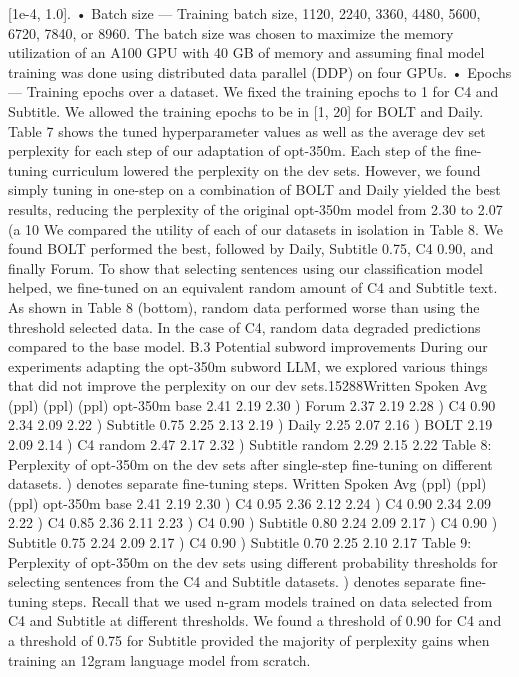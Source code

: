 [1e-4, 1.0].
• Batch size — Training batch size, 1120, 2240,
3360, 4480, 5600, 6720, 7840, or 8960. The batch
size was chosen to maximize the memory utilization of an A100 GPU with 40 GB of memory and
assuming final model training was done using
distributed data parallel (DDP) on four GPUs.
• Epochs — Training epochs over a dataset. We
fixed the training epochs to 1 for C4 and Subtitle.
We allowed the training epochs to be in [1, 20]
for BOLT and Daily.
Table 7 shows the tuned hyperparameter values
as well as the average dev set perplexity for each
step of our adaptation of opt-350m. Each step of
the fine-tuning curriculum lowered the perplexity
on the dev sets. However, we found simply tuning
in one-step on a combination of BOLT and Daily
yielded the best results, reducing the perplexity of
the original opt-350m model from 2.30 to 2.07 (a
10%
We compared the utility of each of our datasets
in isolation in Table 8. We found BOLT performed
the best, followed by Daily, Subtitle 0.75, C4 0.90,
and finally Forum. To show that selecting sentences using our classification model helped, we
fine-tuned on an equivalent random amount of C4
and Subtitle text. As shown in Table 8 (bottom),
random data performed worse than using the threshold selected data. In the case of C4, random data
degraded predictions compared to the base model.
B.3 Potential subword improvements
During our experiments adapting the opt-350m subword LLM, we explored various things that did not
improve the perplexity on our dev sets.15288Written Spoken Avg
(ppl) (ppl) (ppl)
opt-350m base 2.41 2.19 2.30
) Forum 2.37 2.19 2.28
) C4 0.90 2.34 2.09 2.22
) Subtitle 0.75 2.25 2.13 2.19
) Daily 2.25 2.07 2.16
) BOLT 2.19 2.09 2.14
) C4 random 2.47 2.17 2.32
) Subtitle random 2.29 2.15 2.22
Table 8: Perplexity of opt-350m on the dev sets after
single-step fine-tuning on different datasets. ) denotes
separate fine-tuning steps.
Written Spoken Avg
(ppl) (ppl) (ppl)
opt-350m base 2.41 2.19 2.30
) C4 0.95 2.36 2.12 2.24
) C4 0.90 2.34 2.09 2.22
) C4 0.85 2.36 2.11 2.23
) C4 0.90 ) Subtitle 0.80 2.24 2.09 2.17
) C4 0.90 ) Subtitle 0.75 2.24 2.09 2.17
) C4 0.90 ) Subtitle 0.70 2.25 2.10 2.17
Table 9: Perplexity of opt-350m on the dev sets using
different probability thresholds for selecting sentences
from the C4 and Subtitle datasets. ) denotes separate
fine-tuning steps.
Recall that we used n-gram models trained on
data selected from C4 and Subtitle at different
thresholds. We found a threshold of 0.90 for C4
and a threshold of 0.75 for Subtitle provided the
majority of perplexity gains when training an 12gram language model from scratch.
